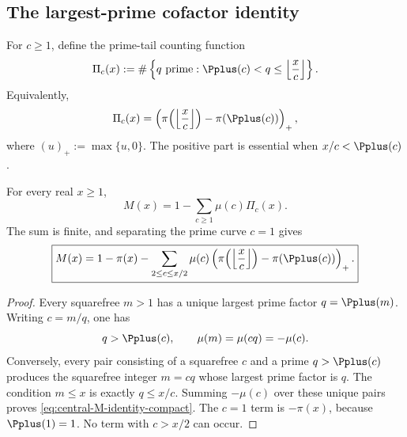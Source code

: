 \subsection{The largest-prime cofactor identity}
\label{subsec:central-identity}

For $c\ge1$, define the prime-tail counting function
\begin{equation}
 \Pi_c(x)
 :=
 \#\left\{
 q\text{ prime}:
 \Pplus(c)<q\le\left\lfloor\frac{x}{c}\right\rfloor
 \right\}.
 \label{eq:Pi-c}
\end{equation}
Equivalently,
\begin{equation}
 \Pi_c(x)
 =
 \left(
 \pi\!\left(\left\lfloor\frac{x}{c}\right\rfloor\right)
 -\pi(\Pplus(c))
 \right)_{+},
 \label{eq:Pi-c-positive-part}
\end{equation}
where $(u)_+:=\max\{u,0\}$.  The positive part is essential when
$x/c<\Pplus(c)$.

\begin{theorem}
\label{thm:central-M-identity}
For every real $x\ge1$,
\begin{equation}
 \boxed{
 M(x)
 =
 1-\sum_{c\ge1}\mu(c)\Pi_c(x).
 }
 \label{eq:central-M-identity-compact}
\end{equation}
The sum is finite, and separating the prime curve $c=1$ gives
\begin{equation}
 \boxed{
 M(x)
 =
 1-\pi(x)
 -\sum_{2\le c\le x/2}
 \mu(c)
 \left(
 \pi\!\left(\left\lfloor\frac{x}{c}\right\rfloor\right)
 -\pi(\Pplus(c))
 \right)_{+}.
 }
 \label{eq:central-M-identity}
\end{equation}
\end{theorem}

\begin{proof}
Every squarefree $m>1$ has a unique largest prime factor
$q=\Pplus(m)$.  Writing $c=m/q$, one has
\[
 q>\Pplus(c),
 \qquad
 \mu(m)=\mu(cq)=-\mu(c).
\]
Conversely, every pair consisting of a squarefree $c$ and a prime
$q>\Pplus(c)$ produces the squarefree integer $m=cq$ whose largest
prime factor is $q$.  The condition $m\le x$ is exactly $q\le x/c$.
Summing $-\mu(c)$ over these unique pairs proves
\cref{eq:central-M-identity-compact}.  The $c=1$ term is
$-\pi(x)$, because $\Pplus(1)=1$.  No term with $c>x/2$ can occur.
\end{proof}

